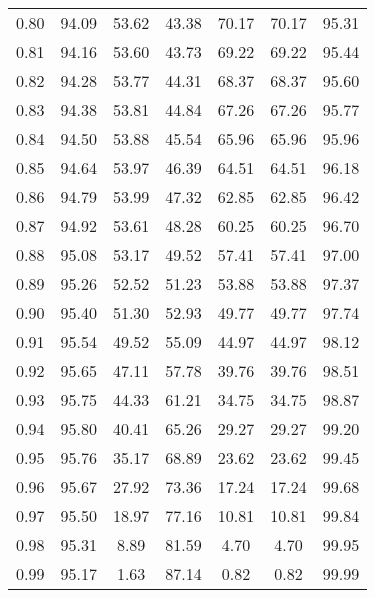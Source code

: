 \begin{tabular}{|c|c|c|c|c|c|c|}
      0.80 &     94.09 &     53.62 &      43.38 &   70.17 &      70.17 &         95.31 \\
      0.81 &     94.16 &     53.60 &      43.73 &   69.22 &      69.22 &         95.44 \\
      0.82 &     94.28 &     53.77 &      44.31 &   68.37 &      68.37 &         95.60 \\
      0.83 &     94.38 &     53.81 &      44.84 &   67.26 &      67.26 &         95.77 \\
      0.84 &     94.50 &     53.88 &      45.54 &   65.96 &      65.96 &         95.96 \\
      0.85 &     94.64 &     53.97 &      46.39 &   64.51 &      64.51 &         96.18 \\
      0.86 &     94.79 &     53.99 &      47.32 &   62.85 &      62.85 &         96.42 \\
      0.87 &     94.92 &     53.61 &      48.28 &   60.25 &      60.25 &         96.70 \\
      0.88 &     95.08 &     53.17 &      49.52 &   57.41 &      57.41 &         97.00 \\
      0.89 &     95.26 &     52.52 &      51.23 &   53.88 &      53.88 &         97.37 \\
      0.90 &     95.40 &     51.30 &      52.93 &   49.77 &      49.77 &         97.74 \\
      0.91 &     95.54 &     49.52 &      55.09 &   44.97 &      44.97 &         98.12 \\
      0.92 &     95.65 &     47.11 &      57.78 &   39.76 &      39.76 &         98.51 \\
      0.93 &     95.75 &     44.33 &      61.21 &   34.75 &      34.75 &         98.87 \\
      0.94 &     95.80 &     40.41 &      65.26 &   29.27 &      29.27 &         99.20 \\
      0.95 &     95.76 &     35.17 &      68.89 &   23.62 &      23.62 &         99.45 \\
      0.96 &     95.67 &     27.92 &      73.36 &   17.24 &      17.24 &         99.68 \\
      0.97 &     95.50 &     18.97 &      77.16 &   10.81 &      10.81 &         99.84 \\
      0.98 &     95.31 &      8.89 &      81.59 &    4.70 &       4.70 &         99.95 \\
      0.99 &     95.17 &      1.63 &      87.14 &    0.82 &       0.82 &         99.99 \\
\bottomrule
\end{tabular}
